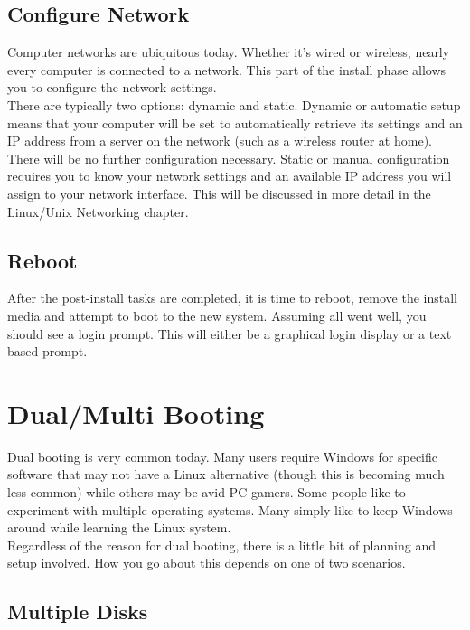 \subsection{Configure Network}

Computer networks are ubiquitous today.  Whether it's wired or wireless, nearly every computer is connected to a network.  This part of the install phase allows you to configure the network settings.\\

There are typically two options: dynamic and static.  Dynamic or automatic setup means that your computer will be set to automatically retrieve its settings and an IP address from a server on the network (such as a wireless router at home).  There will be no further configuration necessary.  Static or manual configuration requires you to know your network settings and an available IP address you will assign to your network interface.  This will be discussed in more detail in the Linux/Unix Networking chapter.

\subsection{Reboot}

After the post-install tasks are completed, it is time to reboot, remove the install media and attempt to boot to the new system.  Assuming all went well, you should see a login prompt.  This will either be a graphical login display or a text based prompt.

\section{Dual/Multi Booting}

Dual booting is very common today.  Many users require Windows for specific software that may not have a Linux alternative (though this is becoming much less common) while others may be avid PC gamers.  Some people like to experiment with multiple operating systems.  Many simply like to keep Windows around while learning the Linux system.\\

Regardless of the reason for dual booting, there is a little bit of planning and setup involved.  How you go about this depends on one of two scenarios.

\subsection{Multiple Disks}

